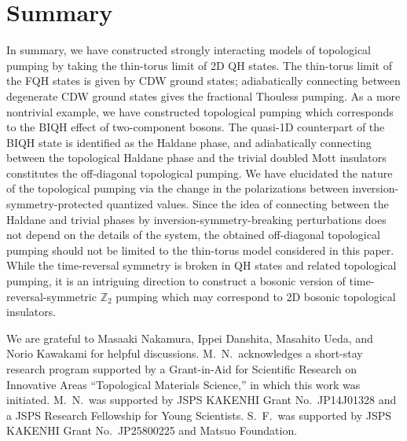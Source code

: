 \documentclass[aps,prb,twocolumn,superscriptaddress,showpacs,floatfix]{revtex4-1}
\begin{document}
\section{Summary\label{summary}}

In summary, we have constructed strongly interacting models of topological pumping by taking the thin-torus limit of 2D QH states. The thin-torus limit of the FQH states is given by CDW ground states; adiabatically connecting between degenerate CDW ground states gives the fractional Thouless pumping. As a more nontrivial example, we have constructed topological pumping which corresponds to the BIQH effect of two-component bosons. The quasi-1D counterpart of the BIQH state is identified as the Haldane phase, and adiabatically connecting between the topological Haldane phase and the trivial doubled Mott insulators constitutes the off-diagonal topological pumping. We have elucidated the nature of the topological pumping via the change in the polarizations between inversion-symmetry-protected quantized values. 
Since the idea of connecting between the Haldane and trivial phases by inversion-symmetry-breaking perturbations does not depend on the details of the system, the obtained off-diagonal topological pumping should not be limited to the thin-torus model considered in this paper. 
While the time-reversal symmetry is broken in QH states and related topological pumping, it is an intriguing direction to construct a bosonic version of time-reversal-symmetric $\mathbb{Z}_2$ pumping\cite{FuKane} which may correspond to 2D bosonic topological insulators.\cite{LiuWen, LiuGuWen}


\begin{acknowledgments}
We are grateful to Masaaki Nakamura, Ippei Danshita, Masahito Ueda, and Norio Kawakami for helpful discussions. M.\ N.\ acknowledges a short-stay research program supported by a Grant-in-Aid for Scientific Research on Innovative Areas ``Topological Materials Science,'' in which this work was initiated. M.\ N.\ was supported by JSPS KAKENHI Grant No.\ JP14J01328 and a JSPS Research Fellowship for Young Scientists. S.\ F.\ was supported by JSPS KAKENHI Grant No.\ JP25800225 and Matsuo Foundation. 
\end{acknowledgments}


\end{document}
